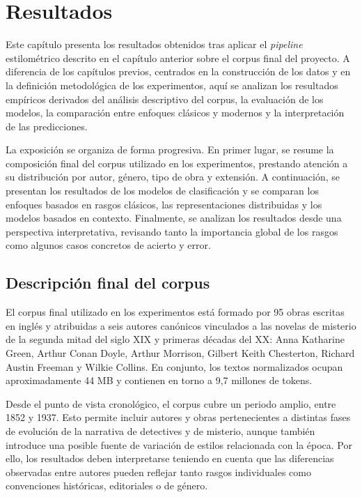 \documentclass[IB]{TFUOC}%
\begin{document}
\chapter{Resultados}

Este capítulo presenta los resultados obtenidos tras aplicar el \textit{pipeline} estilométrico descrito en el capítulo anterior sobre el corpus final del proyecto. A diferencia de los capítulos previos, centrados en la construcción de los datos y en la definición metodológica de los experimentos, aquí se analizan los resultados empíricos derivados del análisis descriptivo del corpus, la evaluación de los modelos, la comparación entre enfoques clásicos y modernos y la interpretación de las predicciones.

La exposición se organiza de forma progresiva. En primer lugar, se resume la composición final del corpus utilizado en los experimentos, prestando atención a su distribución por autor, género, tipo de obra y extensión. A continuación, se presentan los resultados de los modelos de clasificación y se comparan los enfoques basados en rasgos clásicos, las representaciones distribuidas y los modelos basados en contexto. Finalmente, se analizan los resultados desde una perspectiva interpretativa, revisando tanto la importancia global de los rasgos como algunos casos concretos de acierto y error.

\section{Descripción final del corpus}

El corpus final utilizado en los experimentos está formado por 95 obras escritas en inglés y atribuidas a seis autores canónicos vinculados a las novelas de misterio de la segunda mitad del siglo XIX y primeras décadas del XX: Anna Katharine Green, Arthur Conan Doyle, Arthur Morrison, Gilbert Keith Chesterton, Richard Austin Freeman y Wilkie Collins. En conjunto, los textos normalizados ocupan aproximadamente 44 MB y contienen en torno a 9,7 millones de tokens.

Desde el punto de vista cronológico, el corpus cubre un periodo amplio, entre 1852 y 1937. Esto permite incluir autores y obras pertenecientes a distintas fases de evolución de la narrativa de detectives y de misterio, aunque también introduce una posible fuente de variación de estilos relacionada con la época. Por ello, los resultados deben interpretarse teniendo en cuenta que las diferencias observadas entre autores pueden reflejar tanto rasgos individuales como convenciones históricas, editoriales o de género.
\end{document}
